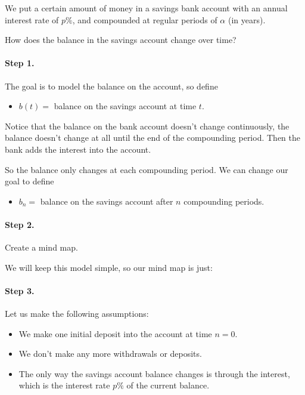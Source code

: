 \begin{example}
We put a certain amount of money in a savings bank account with an annual interest rate of $p\%$, and compounded at regular periods of $\alpha$ (in years).

How does the balance in the savings account change over time? \\

\paragraph{Step 1.} The goal is to model the balance on the account, so define
\begin{itemize}
	\item $b(t)=$ balance on the savings account at time $t$.
\end{itemize}

Notice that the balance on the bank account doesn't change continuously, the balance doesn't change at all until the end of the compounding period. Then the bank adds the interest into the account.

So the balance only changes at each compounding period. We can change our goal to define
\begin{itemize}
	\item $b_n=$ balance on the savings account after $n$ compounding periods.
\end{itemize}


\paragraph{Step 2.} Create a mind map.

We will keep this model simple, so our mind map is just:
\begin{center}
\end{center}


\paragraph{Step 3.} Let us make the following assumptions:
\begin{itemize}
	\item We make one initial deposit into the account at time $n=0$.
	\item We don't make any more withdrawals or deposits.
	\item The only way the savings account balance changes is through the interest, which is the interest rate $p\%$ of the current balance.
\end{itemize}


\end{example}
